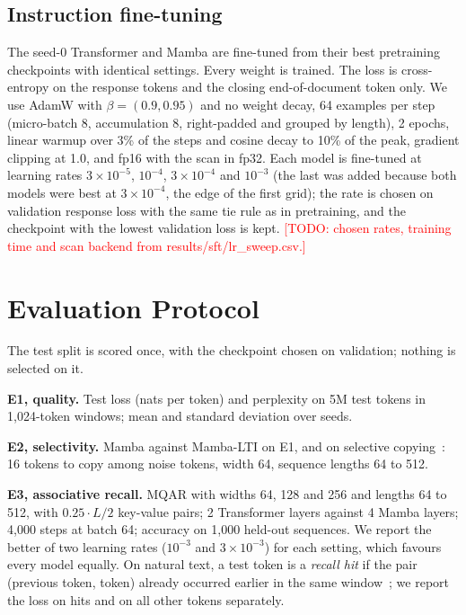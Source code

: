 \documentclass[conference]{IEEEtran}
\newcommand{\todo}[1]{\textcolor{red}{[TODO: #1]}}
\begin{document}
\subsection{Instruction fine-tuning}
The seed-0 Transformer and Mamba are fine-tuned from their best pretraining checkpoints with identical
settings. Every weight is trained. The loss is cross-entropy on the response tokens and the closing
end-of-document token only. We use AdamW with $\beta = (0.9, 0.95)$ and no weight decay, 64 examples per
step (micro-batch 8, accumulation 8, right-padded and grouped by length), 2 epochs, linear warmup over
3\% of the steps and cosine decay to 10\% of the peak, gradient clipping at 1.0, and fp16 with the scan
in fp32. Each model is fine-tuned at learning rates $3\times10^{-5}$, $10^{-4}$, $3\times10^{-4}$ and
$10^{-3}$ (the last was added because both models were best at $3\times10^{-4}$, the edge of the first
grid); the rate is chosen on validation response loss with the same tie rule as in pretraining, and the checkpoint
with the lowest validation loss is kept.
\todo{chosen rates, training time and scan backend from results/sft/lr\_sweep.csv.}

\section{Evaluation Protocol}

The test split is scored once, with the checkpoint chosen on validation; nothing is selected on it.

\textbf{E1, quality.} Test loss (nats per token) and perplexity on 5M test tokens in 1,024-token
windows; mean and standard deviation over seeds.

\textbf{E2, selectivity.} Mamba against Mamba-LTI on E1, and on selective copying~\cite{gu2023mamba}:
16 tokens to copy among noise tokens, width 64, sequence lengths 64 to 512.

\textbf{E3, associative recall.} MQAR with widths 64, 128 and 256 and lengths 64 to 512, with
$0.25 \cdot L/2$ key-value pairs; 2 Transformer layers against 4 Mamba layers; 4,000 steps at batch
64; accuracy on 1,000 held-out sequences. We report the better of two learning rates
($10^{-3}$ and $3\times10^{-3}$) for each setting, which favours every model equally. On natural text,
a test token is a \emph{recall hit} if the pair (previous token, token) already occurred earlier in
the same window~\cite{arora2023zoology}; we report the loss on hits and on all other tokens separately.
\end{document}
